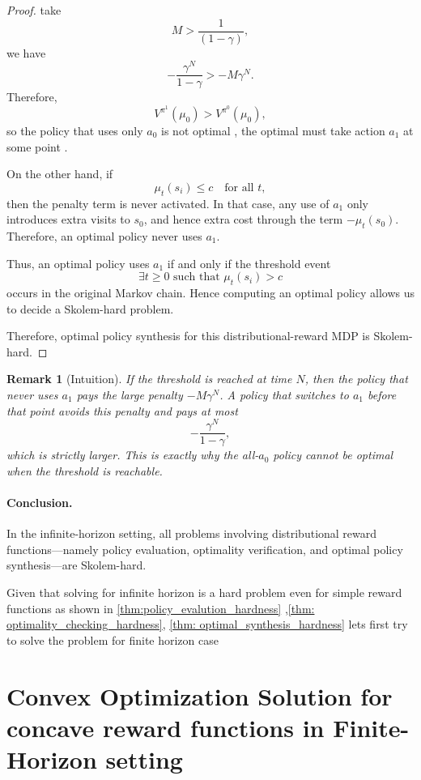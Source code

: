 \documentclass{article}
\newtheorem{remark}{Remark}
\begin{document}
\begin{proof}
take
\[
M > \frac{1}{(1-\gamma)},
\]
we have
\[
-\frac{\gamma^{N}}{1-\gamma} > -M\gamma^N.
\]
Therefore,
\[
V^{\pi^1}(\mu_0) > V^{\pi^0}(\mu_0),
\]
so the policy that uses only $a_0$ is not optimal , the optimal must take action $a_1$ at some point .

On the other hand, if
\[
\mu_t(s_i)\le c \quad \text{for all } t,
\]
then the penalty term is never activated. In that case, any use of $a_1$ only introduces extra visits to $s_0$, and hence extra cost through the term $-\mu_t(s_0)$. Therefore, an optimal policy never uses $a_1$.

Thus, an optimal policy uses $a_1$ if and only if the threshold event
\[
\exists t \ge 0 \text{ such that } \mu_t(s_i)>c
\]
occurs in the original Markov chain. Hence computing an optimal policy allows us to decide a Skolem-hard problem.

Therefore, optimal policy synthesis for this distributional-reward MDP is Skolem-hard.
\end{proof}

\begin{remark}[Intuition]
If the threshold is reached at time $N$, then the policy that never uses $a_1$ pays the large penalty $-M\gamma^N$.
A policy that switches to $a_1$ before that point avoids this penalty and pays at most
\[
-\frac{\gamma^{N}}{1-\gamma},
\]
which is strictly larger. This is exactly why the all-$a_0$ policy cannot be optimal when the threshold is reachable.
\end{remark}


\paragraph{Conclusion.}
In the infinite-horizon setting, all problems involving distributional reward functions—namely policy evaluation, optimality verification, and optimal policy synthesis—are Skolem-hard.


Given that solving for infinite horizon is a hard problem even for simple reward functions as shown in \ref{thm:policy_evalution_hardness} ,\ref{thm: optimality_checking_hardness}, \ref{thm: optimal_synthesis_hardness} lets first try to solve the problem for finite horizon case 


\section{Convex Optimization Solution for concave reward functions in Finite-Horizon setting }
\label{sec:convex-finite-horizon}
\end{document}

